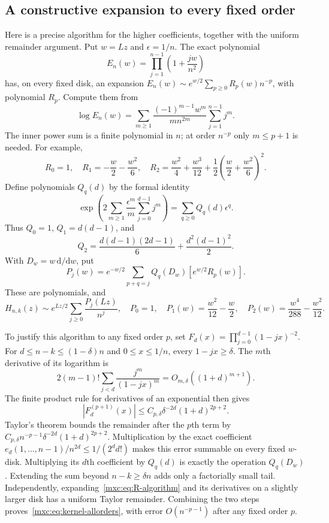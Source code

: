 \documentclass[11pt]{article}
\numberwithin{equation}{section}
\theoremstyle{definition}
\theoremstyle{remark}
\begin{document}
\subsection{A constructive expansion to every fixed order}\label{mxc:sec:allorders}
Here is a precise algorithm for the higher coefficients, together with
the uniform remainder argument. Put $w=Lz$ and $\epsilon=1/n$.
The exact polynomial
\[
 E_n(w)=\prod_{j=1}^{n-1}\left(1+\frac{jw}{n^2}\right)
\]
has, on every fixed disk, an expansion
$E_n(w)\sim e^{w/2}\sum_{p\ge0}R_p(w)n^{-p}$, with polynomial
$R_p$. Compute them from
\begin{equation}\label{mxc:eq:R-algorithm}
 \log E_n(w)=\sum_{m\ge1}\frac{(-1)^{m-1}w^m}{mn^{2m}}
                            \sum_{j=1}^{n-1}j^m.
\end{equation}
The inner power sum is a finite polynomial in $n$; at order $n^{-p}$
only $m\le p+1$ is needed. For example,
\[
 R_0=1,\quad R_1=-\frac w2-\frac{w^2}{6},\quad
 R_2=\frac{w^2}{4}+\frac{w^3}{12}
                 +\frac12\left(\frac w2+\frac{w^2}{6}\right)^2.
\]
Define polynomials $Q_q(d)$ by the formal identity
\begin{equation}\label{mxc:eq:Q-algorithm}
 \exp\left(2\sum_{m\ge1}\frac{\epsilon^m}{m}
                         \sum_{j=0}^{d-1}j^m\right)
   =\sum_{q\ge0}Q_q(d)\epsilon^q.
\end{equation}
Thus $Q_0=1$, $Q_1=d(d-1)$, and
\[
 Q_2=\frac{d(d-1)(2d-1)}6+\frac{d^2(d-1)^2}{2}.
\]
With $D_w=w\,\mathrm d/\mathrm dw$, put
\begin{equation}\label{mxc:eq:P-algorithm}
 P_j(w)=e^{-w/2}\sum_{p+q=j}Q_q(D_w)\left[e^{w/2}R_p(w)\right].
\end{equation}
These are polynomials, and
\begin{equation}\label{mxc:eq:kernel-allorders}
 H_{n,k}(z)\sim e^{Lz/2}\sum_{j\ge0}\frac{P_j(Lz)}{n^j},
 \quad
 P_0=1,\quad P_1(w)=\frac{w^2}{12}-\frac w2,
 \quad P_2(w)=\frac{w^4}{288}-\frac{w^2}{12}.
\end{equation}

To justify this algorithm to any fixed order $p$, set
$F_d(x)=\prod_{j=0}^{d-1}(1-jx)^{-2}$. For
$d\le n-k\le(1-\delta)n$ and $0\le x\le1/n$, every
$1-jx\ge\delta$. The $m$th derivative of its logarithm is
\[
 2(m-1)!\sum_{j<d}\frac{j^m}{(1-jx)^m}
       =O_{m,\delta}((1+d)^{m+1}).
\]
The finite product rule for derivatives of an exponential then gives
\[
 |F_d^{(p+1)}(x)|
 \le C_{p,\delta}\delta^{-2d}(1+d)^{2p+2}.
\]
Taylor's theorem bounds the remainder after the $p$th term by
$C_{p,\delta}n^{-p-1}\delta^{-2d}(1+d)^{2p+2}$.
Multiplication by the exact coefficient
$e_d(1,\ldots,n-1)/n^{2d}\le1/(2^d d!)$ makes this error summable
on every fixed $w$-disk. Multiplying its $d$th coefficient by
$Q_q(d)$ is exactly the operation $Q_q(D_w)$. Extending the sum
beyond $n-k\ge\delta n$ adds only a factorially small tail.
Independently, expanding~\eqref{mxc:eq:R-algorithm} and its derivatives
on a slightly larger disk has a uniform Taylor remainder.
Combining the two steps proves~\eqref{mxc:eq:kernel-allorders}, with
error $O(n^{-p-1})$ after any fixed order $p$.
\end{document}
